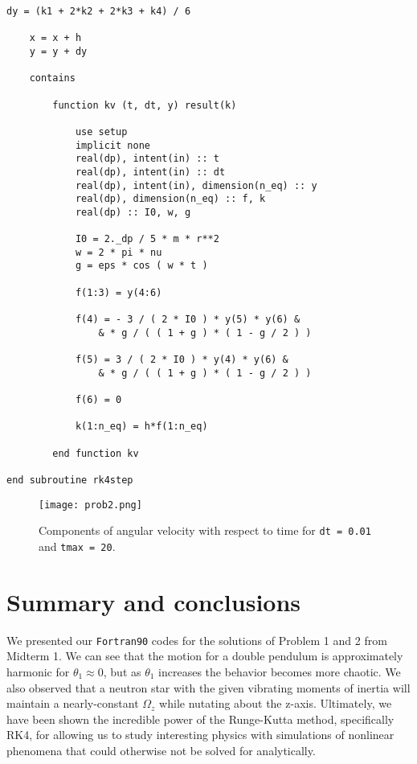 \documentclass[12pt]{article}
\begin{document}
\begin{lstlisting}[frame=single,caption={Module {\tt numtype}},label=starvibe]
    dy = (k1 + 2*k2 + 2*k3 + k4) / 6

    x = x + h 
    y = y + dy

    contains

        function kv (t, dt, y) result(k)

            use setup
            implicit none
            real(dp), intent(in) :: t
            real(dp), intent(in) :: dt
            real(dp), intent(in), dimension(n_eq) :: y
            real(dp), dimension(n_eq) :: f, k
            real(dp) :: I0, w, g

            I0 = 2._dp / 5 * m * r**2
			w = 2 * pi * nu
			g = eps * cos ( w * t )

	        f(1:3) = y(4:6)

			f(4) = - 3 / ( 2 * I0 ) * y(5) * y(6) &
			    & * g / ( ( 1 + g ) * ( 1 - g / 2 ) )

			f(5) = 3 / ( 2 * I0 ) * y(4) * y(6) &
			    & * g / ( ( 1 + g ) * ( 1 - g / 2 ) )

			f(6) = 0

            k(1:n_eq) = h*f(1:n_eq)

        end function kv

end subroutine rk4step

\end{lstlisting}

\begin{figure}[H]
\texttt{[image: prob2.png]}
\caption{Components of angular velocity with respect to time for {\tt dt = 0.01} and {\tt tmax = 20}.}
\label{prob2}
\end{figure}

\section{Summary and conclusions}

We presented our {\tt Fortran90} codes for the solutions of Problem 1 and 2 from Midterm 1.  We can see that the motion for a double pendulum is approximately harmonic for $\theta_1 \approx 0$, but as $\theta_1$ increases the behavior becomes more chaotic.  We also observed that a neutron star with the given vibrating moments of inertia will maintain a nearly-constant $\Omega_z$ while nutating about the z-axis.  Ultimately, we have been shown the incredible power of the Runge-Kutta method, specifically RK4, for allowing us to study interesting physics with simulations of nonlinear phenomena that could otherwise not be solved for analytically.
\end{document}
